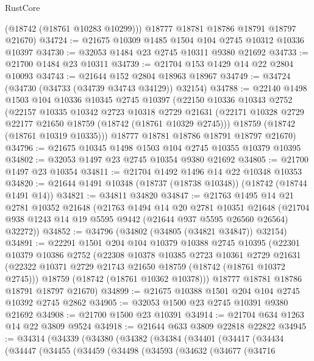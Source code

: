 \begin{lexlean}{RustCore}
\begin{coremodule}
        (@18742 (@18761 @10283 @10299)))
      @18777
      @18781
      @18786
      @18791
      @18797
      @21670)
@34724 := @21675 @10309 @1485 @1504 @104 @2745 @10312 @10336 @10397
@34730 := @32053 @1484 @23 @2745 @10311 @9380 @21692
@34733 := @21700 @1484 @23 @10311
@34739 := @21704 @153 @1429 @14 @22 @2804 @10093
@34743 := @21644 @152 @2804 @18963 @18967
@34749 := @34724 (@34730 (@34733 (@34739 @34743 @34129)) @32154)
@34788 := @22140
    @1498
    @1503
    @104
    @10336
    @10345
    @2745
    @10397
    (@22150
      @10336
      @10343
      @2752
      (@22157
        @10335
        @10342
        @2723
        @10318
        @2729
        @21631
        (@22171 @10328 @2729 @22177 @21650 @18759 (@18742 (@18761 @10329 @2745)))
        @18759
        (@18742 (@18761 @10319 @10335)))
      @18777
      @18781
      @18786
      @18791
      @18797
      @21670)
@34796 := @21675 @10345 @1498 @1503 @104 @2745 @10355 @10379 @10395
@34802 := @32053 @1497 @23 @2745 @10354 @9380 @21692
@34805 := @21700 @1497 @23 @10354
@34811 := @21704 @1492 @1496 @14 @22 @10348 @10353
@34820 := @21644 @1491 @10348 (@18737 (@18738 @10348)) (@18742 (@18744 @1491 @14))
@34821 := @34811 @34820
@34847 := @21763
    @1495
    @14
    @21
    @2781
    @10352
    @21648
    (@21763
      @1494
      @14
      @20
      @2781
      @10351
      @21648
      (@21704 @938 @1243 @14 @19 @5595 @9442 (@21644 @937 @5595 @26560 @26564) @32272))
@34852 := @34796 (@34802 (@34805 (@34821 @34847)) @32154)
@34891 := @22291
    @1501
    @204
    @104
    @10379
    @10388
    @2745
    @10395
    (@22301
      @10379
      @10386
      @2752
      (@22308
        @10378
        @10385
        @2723
        @10361
        @2729
        @21631
        (@22322 @10371 @2729 @21743 @21650 @18759 (@18742 (@18761 @10372 @2745)))
        @18759
        (@18742 (@18761 @10362 @10378)))
      @18777
      @18781
      @18786
      @18791
      @18797
      @21670)
@34899 := @21675 @10388 @1501 @204 @104 @2745 @10392 @2745 @2862
@34905 := @32053 @1500 @23 @2745 @10391 @9380 @21692
@34908 := @21700 @1500 @23 @10391
@34914 := @21704 @634 @1263 @14 @22 @3809 @9524
@34918 := @21644 @633 @3809 @22818 @22822
@34945 := @34314
    (@34339
      (@34380
        (@34382
          (@34384
            (@34401
              (@34417
                (@34434
                  (@34447
                    (@34455
                      (@34459
                        (@34498
                          (@34593
                            (@34632
                              (@34677
                                (@34716

\end{coremodule}
\end{lexlean}
